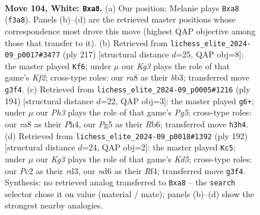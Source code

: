 \documentclass[11pt]{article}
\begin{document}
\clearpage

\begin{figure}[p]\centering
\begin{subfigure}{0.46\textwidth}\centering
\resizebox{\linewidth}{!}{%
\newchessgame
\chessboard[
  setfen={r7/P5k1/3n4/6P1/8/5BKP/2P5/8 w - - 0 104},
  showmover=false,
  pgfstyle=straightmove, color=movearrow, markmove={f3-a8}
]}
\caption{}
\end{subfigure}\hfill
\begin{subfigure}{0.46\textwidth}\centering
\resizebox{\linewidth}{!}{%
\newchessgame
\chessboard[
  setfen={8/4bk2/4p2p/5p2/8/1B3PK1/8/8 b - - 44 109},
  showmover=false,
  pgfstyle=straightmove, color=movearrow, markmove={f7-f6}
]}
\caption{}
\end{subfigure}
\\[4pt]
\begin{subfigure}{0.46\textwidth}\centering
\resizebox{\linewidth}{!}{%
\newchessgame
\chessboard[
  setfen={2r5/5k2/1R6/6Pp/4BK1P/8/8/8 w - - 3 98},
  showmover=false,
  pgfstyle=straightmove, color=movearrow, markmove={g5-g6}
]}
\caption{}
\end{subfigure}\hfill
\begin{subfigure}{0.46\textwidth}\centering
\resizebox{\linewidth}{!}{%
\newchessgame
\chessboard[
  setfen={8/p4k2/2P2P2/3K4/5R2/P2r4/8/8 w - - 3 97},
  showmover=false,
  pgfstyle=straightmove, color=movearrow, markmove={d5-c5}
]}
\caption{}
\end{subfigure}
\caption{\textbf{Move 104, White: \texttt{Bxa8}.} (a) Our position; Melanie plays \texttt{Bxa8} (\texttt{f3a8}). Panels (b)--(d) are the retrieved master positions whose correspondence most drove this move (highest QAP objective among those that transfer to it). (b) Retrieved from \texttt{lichess\_elite\_2024-09\_p0017\#3477} (ply 217) [structural distance $d$=25, QAP obj=8]: the master played \texttt{Kf6}; under $\mu$ our \emph{Kg3} plays the role of that game's \emph{Kf2}; cross-type roles: our \emph{r}a8 as their \emph{b}b3; transferred move \texttt{g3f4}. (c) Retrieved from \texttt{lichess\_elite\_2024-09\_p0005\#1216} (ply 194) [structural distance $d$=22, QAP obj=3]: the master played \texttt{g6+}; under $\mu$ our \emph{Ph3} plays the role of that game's \emph{Pg5}; cross-type roles: our \emph{r}a8 as their \emph{P}h4, our \emph{P}g5 as their \emph{R}b6; transferred move \texttt{h3h4}. (d) Retrieved from \texttt{lichess\_elite\_2024-09\_p0018\#1392} (ply 192) [structural distance $d$=24, QAP obj=2]: the master played \texttt{Kc5}; under $\mu$ our \emph{Kg3} plays the role of that game's \emph{Kd5}; cross-type roles: our \emph{P}c2 as their \emph{r}d3, our \emph{n}d6 as their \emph{R}f4; transferred move \texttt{g3f4}. Synthesis: no retrieved analog transferred to \texttt{Bxa8} -- the \texttt{search} selector chose it on value (material / mate); panels (b)--(d) show the strongest nearby analogies.}
\label{fig:thought-m206}
\end{figure}
\end{document}
